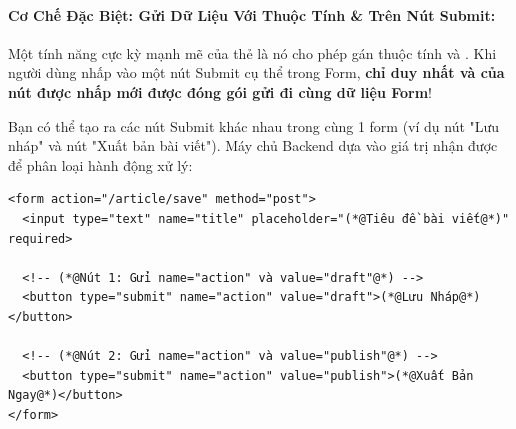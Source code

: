 \paragraph{Cơ Chế Đặc Biệt: Gửi Dữ Liệu Với Thuộc Tính  \&  Trên Nút Submit:}

Một tính năng cực kỳ mạnh mẽ của thẻ  là nó cho phép gán thuộc tính  và . Khi người dùng nhấp vào một nút Submit cụ thể trong Form, \textbf{chỉ duy nhất  và  của nút được nhấp mới được đóng gói gửi đi cùng dữ liệu Form}!

\begin{tipBox}
Bạn có thể tạo ra các nút Submit khác nhau trong cùng 1 form (ví dụ nút "Lưu nháp" và nút "Xuất bản bài viết"). Máy chủ Backend dựa vào giá trị  nhận được để phân loại hành động xử lý:
\end{tipBox}

\begin{codeWindow}
\begin{lstlisting}[language=HTML5]
<form action="/article/save" method="post">
  <input type="text" name="title" placeholder="(*@Tiêu đề bài viết@*)" required>
  
  <!-- (*@Nút 1: Gửi name="action" và value="draft"@*) -->
  <button type="submit" name="action" value="draft">(*@Lưu Nháp@*)</button>
  
  <!-- (*@Nút 2: Gửi name="action" và value="publish"@*) -->
  <button type="submit" name="action" value="publish">(*@Xuất Bản Ngay@*)</button>
</form>
\end{lstlisting}
\end{codeWindow}

\begin{browserWindow}
\sffamily\small
{} \\[6pt]
 \quad
{}
\end{browserWindow}

